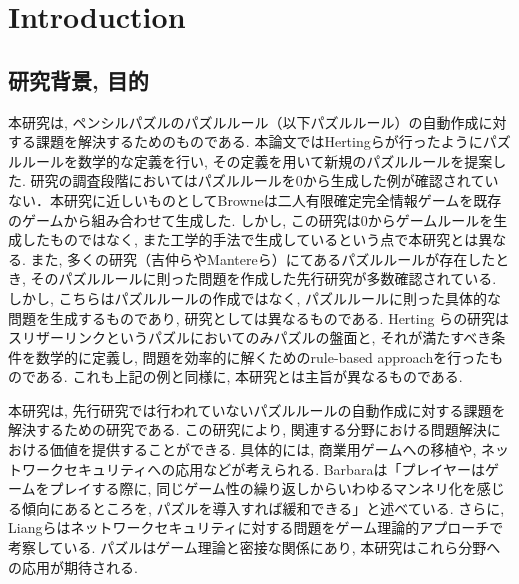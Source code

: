 \chapter{{\rm \bf Introduction}}
\section{研究背景, 目的}
本研究は, ペンシルパズルのパズルルール（以下パズルルール）の自動作成に対する課題を解決するためのものである. 本論文ではHertingら\cite{Herting2004}が行ったようにパズルルールを数学的な定義を行い, その定義を用いて新規のパズルルールを提案した. 研究の調査段階においてはパズルルールを0から生成した例が確認されていない．本研究に近しいものとしてBrowne\cite{Browne2010}は二人有限確定完全情報ゲームを既存のゲームから組み合わせて生成した. しかし, この研究は0からゲームルールを生成したものではなく, また工学的手法で生成しているという点で本研究とは異なる. また, 多くの研究（吉仲ら\cite{Yoshinaka2012}やMantereら\cite{Mantere2007}）にてあるパズルルールが存在したとき, そのパズルルールに則った問題を作成した先行研究が多数確認されている. しかし, こちらはパズルルールの作成ではなく, パズルルールに則った具体的な問題を生成するものであり, 研究としては異なるものである. Herting	ら\cite{Herting2004}の研究はスリザーリンクというパズルにおいてのみパズルの盤面と, それが満たすべき条件を数学的に定義し, 問題を効率的に解くためのrule-based approachを行ったものである. これも上記の例と同様に, 本研究とは主旨が異なるものである.

本研究は, 先行研究では行われていないパズルルールの自動作成に対する課題を解決するための研究である. この研究により, 関連する分野における問題解決における価値を提供することができる. 具体的には, 商業用ゲームへの移植や, ネットワークセキュリティへの応用などが考えられる. Barbara\cite{Barbara2020}は「プレイヤーはゲームをプレイする際に, 同じゲーム性の繰り返しからいわゆるマンネリ化を感じる傾向にあるところを, パズルを導入すれば緩和できる」と述べている. さらに, Liangら\cite{Liang2013}はネットワークセキュリティに対する問題をゲーム理論的アプローチで考察している. パズルはゲーム理論と密接な関係にあり, 	本研究はこれら分野への応用が期待される.


